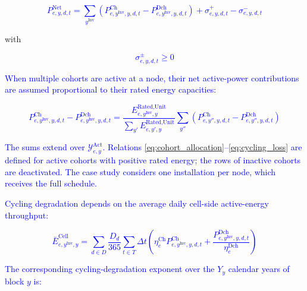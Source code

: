 \documentclass[preprint,12pt]{elsarticle}
\begin{document}
\textcolor{blue}{
    \begin{equation}
        P^{\text{Net}}_{e,y,d,t} = \sum_{y^\text{Inv}} \left( P^{\text{Ch}}_{e,y^\text{Inv},y,d,t} - P^{\text{Dch}}_{e,y^\text{Inv},y,d,t} \right)
        + \sigma^{+}_{e,y,d,t} - \sigma^{-}_{e,y,d,t}
        \label{eq:esso_net_power}
    \end{equation}
}

\noindent
with

\textcolor{blue}{
    \begin{equation}
        \sigma^{\pm}_{e,y,d,t} \ge 0
    \end{equation}    
}

\textcolor{blue}{
    When multiple cohorts are active at a node, their net active-power contributions are assumed proportional to their rated energy capacities:
}

\textcolor{blue}{
    \begin{equation}
        P^{\text{Ch}}_{e,y^\text{Inv},y,d,t} - P^{\text{Dch}}_{e,y^\text{Inv},y,d,t} =
        \frac{E^{\text{Rated,Unit}}_{e,y^\text{Inv},y}}{\sum_{y'} E^{\text{Rated,Unit}}_{e,y',y}}
        \sum_{y''} \left( P^{\text{Ch}}_{e,y'',y,d,t} - P^{\text{Dch}}_{e,y'',y,d,t} \right)
        \label{eq:cohort_allocation}
    \end{equation}
}

\textcolor{blue}{
    The sums extend over $\mathcal{Y}^{\text{Act}}_{e,y}$. Relations \eqref{eq:cohort_allocation}--\eqref{eq:cycling_loss} are defined for active cohorts with positive rated energy; the rows of inactive cohorts are deactivated. The case study considers one installation per node, which receives the full schedule.
}

\textcolor{blue}{
    Cycling degradation depends on the average daily cell-side active-energy throughput:
}

\textcolor{blue}{
    \begin{equation}
        \bar{E}^{\text{Cell}}_{e,y^\text{Inv},y} =
        \sum_{d \in D} \frac{D_d}{365} \sum_{t \in T} \Delta t
        \left(
            \eta^{\text{Ch}}_e P^{\text{Ch}}_{e,y^\text{Inv},y,d,t}
            +
            \frac{P^{\text{Dch}}_{e,y^\text{Inv},y,d,t}}{\eta^{\text{Dch}}_e}
        \right)
        \label{eq:cell_throughput}
    \end{equation}
}

\textcolor{blue}{
    The corresponding cycling-degradation exponent over the $Y_y$ calendar years of block $y$ is:
}
\end{document}
